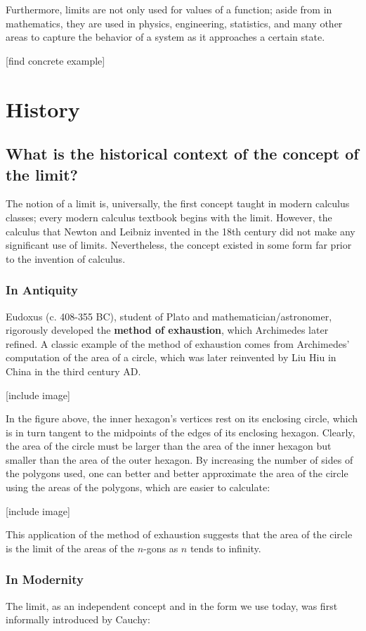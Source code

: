 Furthermore, limits are not only used for values of a function; aside from in mathematics, they are used in physics, engineering, statistics, and many other areas to capture the behavior of a system as it approaches a certain state.

[find concrete example]

\section{History}
\subsection{What is the historical context of the concept of the limit?}
The notion of a limit is, universally, the first concept taught in modern calculus classes; every modern calculus textbook begins with the limit. However, the calculus that Newton and Leibniz invented in the 18th century did not make any significant use of limits. Nevertheless, the concept existed in some form far prior to the invention of calculus.

\subsubsection{In Antiquity}
Eudoxus (c. 408-355 BC), student of Plato and mathematician/astronomer, rigorously developed the \textbf{method of exhaustion}, which Archimedes later refined. A classic example of the method of exhaustion comes from Archimedes' computation of the area of a circle, which was later reinvented by Liu Hiu in China in the third century AD.

[include image]

In the figure above, the inner hexagon's vertices rest on its enclosing circle, which is in turn tangent to the midpoints of the edges of its enclosing hexagon. Clearly, the area of the circle must be larger than the area of the inner hexagon but smaller than the area of the outer hexagon. By increasing the number of sides of the polygons used, one can better and better approximate the area of the circle using the areas of the polygons, which are easier to calculate:

[include image]

This application of the method of exhaustion suggests that the area of the circle is the limit of the areas of the $n$-gons as $n$ tends to infinity.

\subsubsection{In Modernity}
The limit, as an independent concept and in the form we use today, was first informally introduced by Cauchy:


